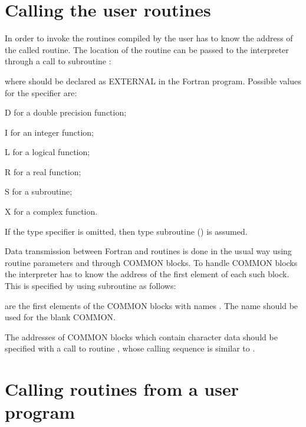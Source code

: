\section{Calling the user routines}
\label{sec:callinguserroutines}
 
In order to invoke the routines compiled by the user \COMIS{}
has to know the address of the called routine. 
The location of the routine can be passed
to the \COMIS{} interpreter through a call to subroutine :


where  should be declared as
EXTERNAL in the Fortran program.
Possible values for the  specifier are:

\begin{DLtt}{1}
\item[D] for a double precision function;
\item[I] for an integer function;
\item[L] for a logical function;
\item[R] for a real function;
\item[S] for a subroutine;
\item[X] for a complex function.
\end{DLtt}

If the type specifier is omitted, then 
type subroutine () is assumed.

Data transmission between Fortran and \COMIS{} routines
is done in the usual way using routine parameters and
through COMMON blocks. 
To handle COMMON blocks
the interpreter  has to know the address of the first element
of each such block.
This is specified by using subroutine  as follows:


 are the first elements of the COMMON blocks with
names .
The name  should be used for the blank COMMON.

The addresses of COMMON blocks which contain character data should be 
specified with a call to routine , whose
calling sequence is similar to .

\section{Calling \COMIS{} routines from a user program}
 

